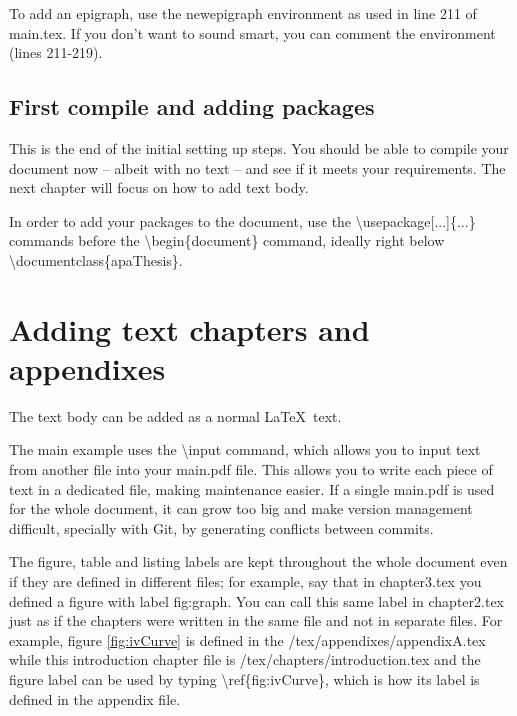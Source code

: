 	To add an epigraph, use the {\ttfamily\small newepigraph} environment as used in line 211 of {\ttfamily\small main.tex}. If you don't want to sound smart, you can comment the environment (lines 211-219).

	\subsection{First compile and adding packages}%

	This is the end of the initial setting up steps. You should be able to compile your document now -- albeit with no text -- and see if it meets your requirements. The next chapter will focus on how to add text body.

	In order to add your packages to the document, use the {\ttfamily\small \textbackslash usepackage[...]\{...\}} commands before the {\ttfamily\small \textbackslash begin\{document\}} command, ideally right below {\ttfamily\small \textbackslash documentclass\{apaThesis\}}.

	\section{Adding text chapters and appendixes}%

	The text body can be added as a normal \LaTeX\ text.

	The main example uses the {\ttfamily\small \textbackslash input} command, which allows you to input text from another file into your {\ttfamily\small main.pdf} file. This allows you to write each piece of text in a dedicated file, making maintenance easier. If a single {\ttfamily\small main.pdf} is used for the whole document, it can grow too big and make version management difficult, specially with Git, by generating conflicts between commits.

	The figure, table and listing labels are kept throughout the whole document even if they are defined in different files; for example, say that in {\ttfamily\small chapter3.tex} you defined a figure with label {\ttfamily\small fig:graph}. You can call this same label in {\ttfamily\small chapter2.tex} just as if the chapters were written in the same file and not in separate files. For example, figure \ref{fig:ivCurve} is defined in the {\ttfamily\small /tex/appendixes/appendixA.tex} while this introduction chapter file is {\ttfamily\small /tex/chapters/introduction.tex} and the figure label can be used by typing {\ttfamily\small \textbackslash ref\{fig:ivCurve\}}, which is how its label is defined in the appendix file.

